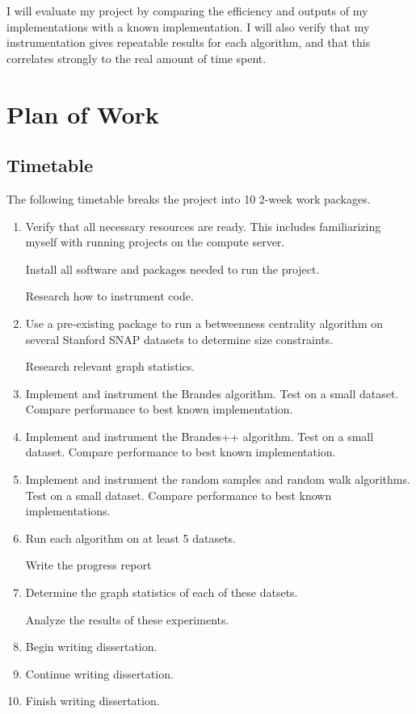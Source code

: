 \documentclass[a4paper,12pt]{article}
\begin{document}
I will evaluate my project by comparing the efficiency and outputs of my implementations with a known implementation. I will also verify that my instrumentation gives repeatable results for each algorithm, and that this correlates strongly to the real amount of time spent.

\section{Plan of Work}
\subsection{Timetable}
The following timetable breaks the project into 10 2-week work packages.
\begin{enumerate}
\item Verify that all necessary resources are ready. This includes familiarizing myself with running projects on the compute server.

Install all software and packages needed to run the project.

Research how to instrument code.

\item Use a pre-existing package to run a betweenness centrality algorithm on several Stanford SNAP datasets to determine size constraints.

Research relevant graph statistics.
\item Implement and instrument the Brandes algorithm. Test on a small dataset. Compare performance to best known implementation.

\item Implement and instrument the Brandes++ algorithm. Test on a small dataset. Compare performance to best known implementation.

\item Implement and instrument the random samples and random walk algorithms. Test on a small dataset. Compare performance to best known implementations.

\item Run each algorithm on at least 5 datasets.

Write the progress report

\item Determine the graph statistics of each of these datsets.

Analyze the results of these experiments.

\item Begin writing dissertation.

\item Continue writing dissertation.

\item Finish writing dissertation.

\end{enumerate}
\end{document}
